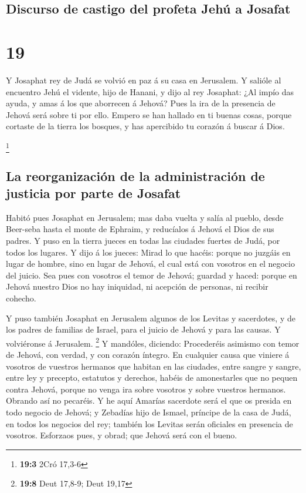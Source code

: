 \hypertarget{discurso-de-castigo-del-profeta-jehuxfa-a-josafat}{%
\subsection{Discurso de castigo del profeta Jehú a
Josafat}\label{discurso-de-castigo-del-profeta-jehuxfa-a-josafat}}

\hypertarget{section-18}{%
\section{19}\label{section-18}}

 Y Josaphat rey de Judá se volvió en paz á su casa en
Jerusalem.  Y salióle al encuentro Jehú el vidente, hijo
de Hanani, y dijo al rey Josaphat: ¿Al impío das ayuda, y amas á los que
aborrecen á Jehová? Pues la ira de la presencia de Jehová será sobre ti
por ello.  Empero se han hallado en ti buenas cosas,
porque cortaste de la tierra los bosques, y has apercibido tu corazón á
buscar á Dios.

\footnote{\textbf{19:3} 2Cró 17,3-6}

\hypertarget{la-reorganizaciuxf3n-de-la-administraciuxf3n-de-justicia-por-parte-de-josafat}{%
\subsection{La reorganización de la administración de justicia por parte
de
Josafat}\label{la-reorganizaciuxf3n-de-la-administraciuxf3n-de-justicia-por-parte-de-josafat}}

 Habitó pues Josaphat en Jerusalem; mas daba vuelta y
salía al pueblo, desde Beer-seba hasta el monte de Ephraim, y reducíalos
á Jehová el Dios de sus padres.  Y puso en la tierra
jueces en todas las ciudades fuertes de Judá, por todos los lugares.
 Y dijo á los jueces: Mirad lo que hacéis: porque no
juzgáis en lugar de hombre, sino en lugar de Jehová, el cual está con
vosotros en el negocio del juicio.  Sea pues con vosotros
el temor de Jehová; guardad y haced: porque en Jehová nuestro Dios no
hay iniquidad, ni acepción de personas, ni recibir cohecho.

 Y puso también Josaphat en Jerusalem algunos de los
Levitas y sacerdotes, y de los padres de familias de Israel, para el
juicio de Jehová y para las causas. Y volviéronse á Jerusalem.
\footnote{\textbf{19:8} Deut 17,8-9; Deut 19,17}  Y
mandóles, diciendo: Procederéis asimismo con temor de Jehová, con
verdad, y con corazón íntegro.  En cualquier causa que
viniere á vosotros de vuestros hermanos que habitan en las ciudades,
entre sangre y sangre, entre ley y precepto, estatutos y derechos,
habéis de amonestarles que no pequen contra Jehová, porque no venga ira
sobre vosotros y sobre vuestros hermanos. Obrando así no pecaréis.
 Y he aquí Amarías sacerdote será el que os presida en
todo negocio de Jehová; y Zebadías hijo de Ismael, príncipe de la casa
de Judá, en todos los negocios del rey; también los Levitas serán
oficiales en presencia de vosotros. Esforzaos pues, y obrad; que Jehová
será con el bueno.

